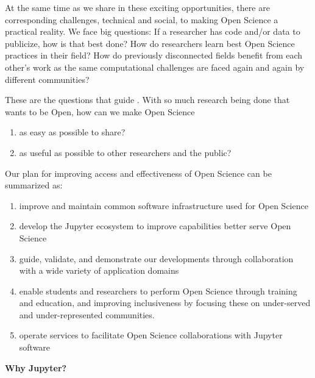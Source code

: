 At the same time as we share in these exciting opportunities, there
are corresponding challenges, technical and social, to making Open
Science a practical reality.  We face big questions: If a researcher
has code and/or data to publicize, how is that best done?  How do
researchers learn best Open Science practices in their field?  How do
previously disconnected fields benefit from each other's work as the
same computational challenges are faced again and again by different
communities?

These are the questions that guide \TheProject.
With so much research being done that wants to be Open,
how can we make Open Science

\begin{enumerate}
    \item as easy as possible to share?
    \item as useful as possible to other researchers and the public?
\end{enumerate}

Our plan for improving access and effectiveness of Open Science can be summarized as:

\begin{enumerate}
\item improve and maintain common software infrastructure used for
  Open Science
\item develop the Jupyter ecosystem to improve capabilities better
  serve Open Science
\item guide, validate, and demonstrate our developments through
  collaboration with a wide variety of application domains
\item enable students and researchers to perform Open Science through
  training and education, and improving inclusiveness by focusing
  these on under-served and under-represented communities.
\item operate services to facilitate Open Science collaborations with
  Jupyter software
\end{enumerate}

\textbf{Why Jupyter?}

